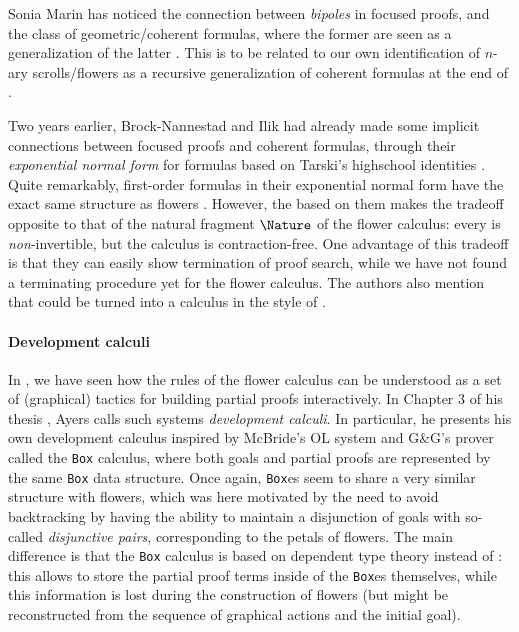 Sonia Marin has noticed the connection between \emph{bipoles} in focused proofs,
and the class of geometric/coherent formulas, where the former are seen as a
generalization of the latter . This is to be related
to our own identification of $n$-ary scrolls/flowers as a recursive
generalization of coherent formulas at the end of .

Two years earlier, Brock-Nannestad and Ilik had already made some implicit
connections between focused proofs and coherent formulas, through their
\emph{exponential normal form} for  formulas based on Tarski's
highschool identities . Quite
remarkably, first-order formulas in their exponential normal form have the exact
same structure as flowers
\cite[Definition~4.2]{brock-nannestad_intuitionistic_2019}. However, the   based on them makes the tradeoff opposite to that of the
natural fragment $\Nature$ of the flower calculus: every  is
\emph{non}-invertible, but the calculus is contraction-free. One advantage of
this tradeoff is that they can easily show termination of proof search, while we
have not found a terminating procedure yet for the flower calculus. The authors
also mention that  could be turned into a  calculus in the
style of .

\paragraph{Development calculi}

In , we have seen how the rules of the flower calculus
can be understood as a set of (graphical) tactics for building partial proofs
interactively. In Chapter 3 of his thesis , Ayers calls
such systems \emph{development calculi}. In particular, he presents his own
development calculus inspired by McBride's OL system
 and G\&G's prover
 called the \texttt{Box} calculus, where both
goals and partial proofs are represented by the same \texttt{Box} data
structure. Once again, \texttt{Box}es seem to share a very similar structure
with flowers, which was here motivated by the need to avoid backtracking by
having the ability to maintain a disjunction of goals with so-called
\emph{disjunctive pairs}, corresponding to the petals of flowers. The main
difference is that the \texttt{Box} calculus is based on dependent type theory
instead of : this allows to store the partial proof terms
inside of the \texttt{Box}es themselves, while this information is lost during
the construction of flowers (but might be reconstructed from the sequence of
graphical actions and the initial goal).

